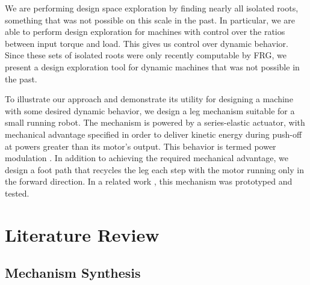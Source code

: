 \documentclass[journal]{IEEEtran}
\begin{document}
We are performing design space exploration by finding nearly all isolated roots, something that was not possible on this scale in the past.
In particular, we are able to perform design exploration for machines with control over the ratios between input torque and load.  This gives us control over dynamic behavior.
Since these sets of isolated roots were only recently computable by FRG, we present a design exploration tool for dynamic machines that was not possible in the past.


To illustrate our approach and demonstrate its utility for designing a machine with some desired dynamic behavior, 
we design a leg mechanism suitable for a small running robot.
The mechanism is powered by a series-elastic actuator, with mechanical advantage specified in order to deliver kinetic energy during push-off at powers greater than its motor's output.
This behavior is termed power modulation \cite{haldaneRoboticVerticalJumping2016}.
In addition to achieving the required mechanical advantage, we design a foot path that recycles the leg each step with the motor running only in the forward direction.
In a related work \cite{plecnikAdjustablePowerModulation2019}, this mechanism was prototyped and tested.



\section{Literature Review}
\label{sec:lit_rev}

\subsection{Mechanism Synthesis}
\label{sec:mech_synth}
\end{document}
